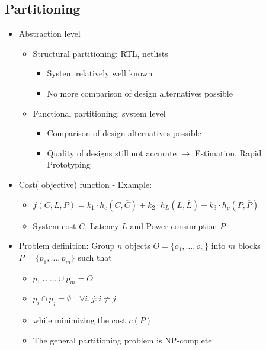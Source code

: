 \subsection{Partitioning}
\begin{itemize}
	\item Abstraction level
\begin{itemize}
	\item Structural partitioning: RTL, netlists
\begin{itemize}
	\item System relatively well known
	\item No more comparison of design alternatives possible 
\end{itemize}
	\item Functional partitioning: system level
\begin{itemize}
	\item Comparison of design alternatives possible
	\item Quality of designs still not accurate
	$\rightarrow$ Estimation, Rapid Prototyping
\end{itemize}
\end{itemize}
	\item Cost( objective) function - Example:
\begin{itemize}
	\item $f(C, L, P) = k_1 \cdot h_c(C, \overline C) + k_2 \cdot h_L (L, \overline L) + k_3 \cdot h_p(P, \overline P)$
	\item System cost $C$, Latency $L$ and Power consumption $P$ 
\end{itemize}
	\item Problem definition: Group $n$ objects $O = \{o_1, \dots, o_n\}$ into $m$ blocks $P = \{p_1, \dots, p_m\}$ such that
\begin{itemize}
	\item $p_1 \cup \dots \cup p_m = O$
	\item $p_i \cap p_j = \emptyset \quad \forall i, j:i\not = j$
	\item while minimizing the cost $c(P)$
	\item The general partitioning problem is NP-complete
\end{itemize}
\end{itemize}

